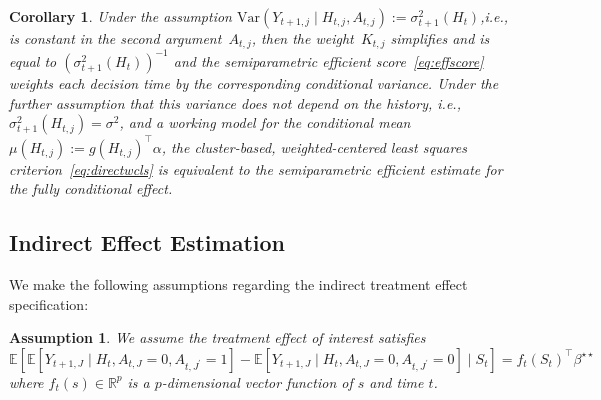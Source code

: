 \documentclass[12pt]{article}
\def\E{\mathbb{E}}
\newtheorem{cor}[thm]{Corollary}
\newtheorem{assumption}[thm]{Assumption}
\begin{document}
\begin{cor}
\label{cor:semiparametricconnection}
Under the assumption $\text{Var}(Y_{t+1,j} \mid H_{t,j}, A_{t,j}) := \sigma^2_{t+1}(H_t)$,i.e., is constant in the second argument~$A_{t,j}$, then the weight~$K_{t,j}$ simplifies and is equal to $(\sigma^2_{t+1}(H_t))^{-1}$ and the semiparametric efficient score~\eqref{eq:effscore} weights each decision time by the corresponding conditional variance.  Under the further assumption that this variance does not depend on the history, i.e., $\sigma^2_{t+1} (H_{t,j}) = \sigma^2$, and a working model for the conditional mean $\mu (H_{t,j}) := g (H_{t,j})^\top \alpha$, the cluster-based, weighted-centered least squares criterion~\eqref{eq:directwcls} is equivalent to the semiparametric efficient estimate for the fully conditional effect.
\end{cor}

\subsection{Indirect Effect Estimation}
\label{section:indirect}

We make the following assumptions regarding the indirect treatment effect specification:

\begin{assumption} \normalfont
\label{ass:indirecteffect}
We assume the treatment effect of interest satisfies
$$
\E \left[ \E \left[ Y_{t+1, J} \mid H_t, A_{t,J} = 0, A_{t,J^\prime} = 1 \right] - \E \left[ Y_{t+1, J} \mid H_t, A_{t,J} = 0, A_{t,J^\prime} = 0 \right] \mid S_t \right] = f_t (S_t)^\top \beta^{\star \star}
$$
where $f_t (s) \in \mathbb{R}^p$ is a $p$-dimensional vector function of $s$ and time $t$.
\end{assumption}
\end{document}
